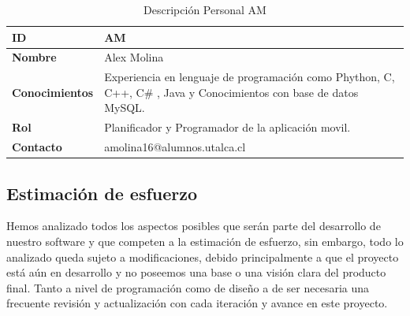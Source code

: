 \begin{table}[H]
    \centering
        \begin{tabular}{|l | p{12cm} |}        
        \hline
        \textbf{ID} & AM \\
        \hline
        \textbf{Nombre} & Alex Molina \\
        \hline
        \textbf{Conocimientos} & Experiencia en lenguaje de programación como Phython, C, C++, C\# , Java y Conocimientos con base de datos MySQL. \\
        \hline
        \textbf{Rol} & Planificador y Programador de la aplicación movil. \\    
        \hline
        \textbf{Contacto} & amolina16@alumnos.utalca.cl \\
        \hline            
        \end{tabular}
    \caption{Descripción Personal AM}
\end{table}



\subsection{Estimación de esfuerzo}
Hemos analizado todos los aspectos posibles que serán parte del desarrollo de nuestro software y que competen a la estimación de esfuerzo, sin embargo, todo lo analizado queda sujeto a modificaciones, debido principalmente a que el proyecto está aún en desarrollo y no poseemos una base o una visión clara del producto final. Tanto a nivel de programación como de diseño a de ser necesaria una frecuente revisión y actualización con cada iteración y avance en este proyecto.

